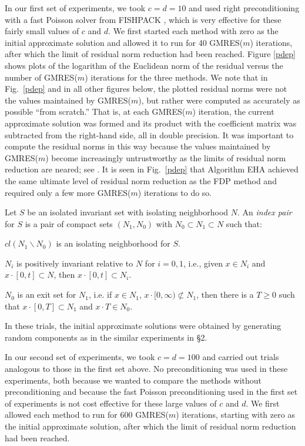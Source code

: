 \documentclass{SIAMGHbook2016}
\def\fishpack{{FISHPACK}}
\def\gmresm{{\rm GMRES($m$)}}
\begin{document}
In our first set of experiments, we took $c=d=10$ and used right
preconditioning with a fast Poisson solver from {\fishpack}
\cite{Swarztrauber-Sweet}, which is very effective for these
fairly small values of $c$ and $d$. We first started each method
with zero as the initial approximate solution and allowed it
to run for 40 {\gmresm} iterations, after which the limit of residual
norm reduction had been reached. Figure \ref{pdep} shows plots
of the logarithm of the Euclidean norm of the residual versus
the number of {\gmresm} iterations for the three methods. We note
that in  Fig.~\ref{pdep} and in all other figures below, the plotted
residual norms were not the values maintained by {\gmresm}, but rather
were computed as accurately as possible ``from scratch.''  That is,
at each {\gmresm} iteration, the current approximate solution was
formed and its product with the coefficient matrix was subtracted
from the right-hand side, all in double precision.
It was important to compute the residual norms in this way because
the values maintained by {\gmresm} become increasingly untrustworthy
as the limits of residual norm reduction are neared; see \cite{Walker88}.
It is seen in Fig.~\ref{pdep}
that Algorithm EHA achieved
the same ultimate level of residual norm reduction as the FDP
method and required only a few more {\gmresm} iterations to do
so.

\begin{example}
Let $S$ be an isolated invariant set with isolating neighborhood $N$.
An {\em index pair} for $S$ is a pair of compact sets $(N_{1},N_{0})$
with $N_{0} \subset N_{1} \subset N$ such that:
\begin{romannum}
\item $cl(N_{1} \backslash N_{0})$
is an isolating neighborhood for $S$.
\item $N_{i}$ is positively invariant relative to $N$ for $i=0,1$,
i.e., given
$x \in N_{i}$ and $x \cdot [0,t] \subset N$, then $x \cdot [0,t] \subset
N_{i}$.
\item $N_{0}$ is an exit set for $N_{1}$, i.e. if $x \in N_{1}$,
$x \cdot [0, \infty ) \not\subset N_{1}$, then there is a $T \geq 0$ such
that $x \cdot [0,T] \subset N_{1}$ and $x \cdot T \in N_{0}$.
\end{romannum}
In these trials,
the initial approximate solutions were obtained by generating random
components as in the similar experiments in \S2. \qquad\end{example}



In our second set of experiments, we took $c=d=100$ and carried out
trials analogous to those in the first set above. No preconditioning
was used in these experiments, both because we wanted to compare
the methods without preconditioning and because the fast
Poisson preconditioning used in the first set of experiments is
not cost effective for these large values of $c$ and $d$. We first
allowed each method to run for 600 {\gmresm} iterations,
starting with zero as the initial approximate solution, after which
the limit of residual norm reduction had been reached.
\end{document}
